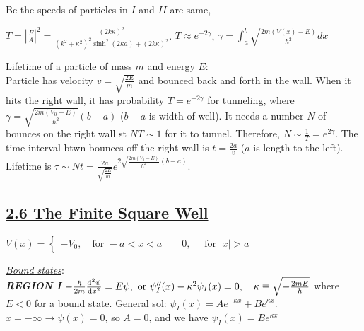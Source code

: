 Bc the speeds of particles in $I$ and $II$ are same, 

\tiny
$T = |\frac{F}{A}|^2 = \frac{(2 k \kappa)^2}{(k^2 + \kappa^2)^2 \sinh^2(2\kappa a) + (2 k \kappa)^2}$.
$T \approx e^{-2 \gamma}$, $\gamma = \int_{a}^{b} \sqrt{\frac{2m (V(x) - E)}{\hbar^2}} dx$
\scriptsize

Lifetime of a particle of mass $m$ and energy $E$: \\
Particle has velocity $v = \sqrt{\frac{2E}{m}}$ and bounced back and forth in the wall. When it hits the right wall, it has probability $T=e^{-2\gamma}$ for tunneling, where $\gamma = \sqrt{\frac{2m(V_0 - E)}{\hbar^2}}(b-a)$ ($b-a$ is width of well). It needs a number $N$ of bounces on the right wall st $NT \sim 1$ for it to tunnel. Therefore, $N \sim \frac{1}{T} = e^{2\gamma}$. The time interval btwn bounces off the right wall is $t = \frac{2a}{v}$ ($a$ is length to the left). Lifetime is $\tau \sim Nt = \frac{2a}{\sqrt{\frac{2E}{m}}} e^{2 \sqrt{\frac{2m(V_0 - E)}{\hbar^2}} (b-a)}$.

\subsection{\underline{2.6 The Finite Square Well}}
$V(x) = 
\begin{cases}
    -V_{0}, \quad \textrm{for } -a < x < a \qquad
    0, \quad \textrm{ for } |x| > a &
\end{cases}$



\textit{\underline{Bound states}}: \\

\textbf{\textit{REGION I}}
$-\frac{\hbar}{2m} \dv[2]{\psi}{x} = E \psi, \textrm{ or } \psi''_{I}(x) - \kappa^2 \psi_{I}(x) = 0, \quad \kappa \equiv \sqrt{-\frac{2mE}{\hbar}}$
where $E < 0$ for a bound state. 
General sol: $\psi_{I}(x) = Ae^{-\kappa x} + B e^{\kappa x}$. \\
$x = -\infty \rightarrow \psi(x) = 0$, so $A = 0$, and we have $\psi_{I}(x) = Be^{\kappa x}$

